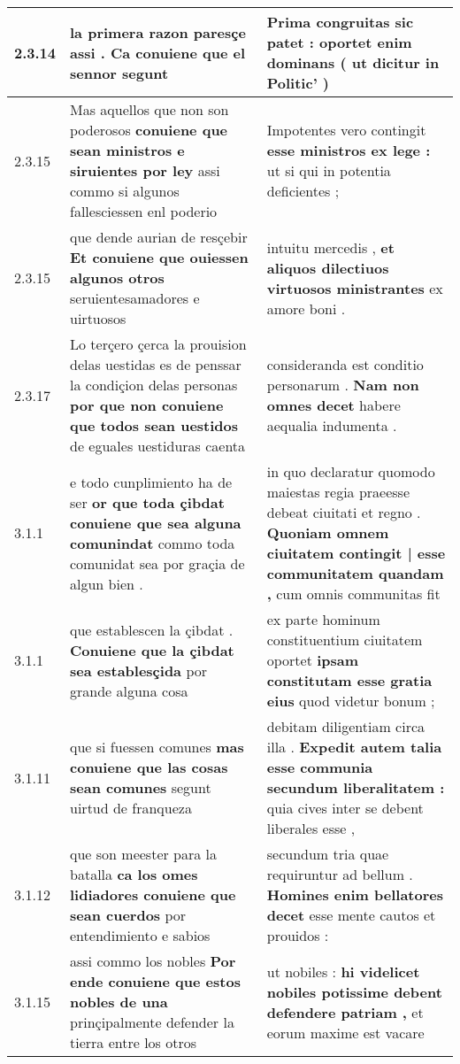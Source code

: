 \begin{tabular}{|p{1cm}|p{6.5cm}|p{6.5cm}|}
2.3.14 & la primera razon paresçe assi . \textbf{ Ca conuiene que el sennor } segunt & Prima congruitas sic patet : \textbf{ oportet enim dominans } ( ut dicitur in Politic’ ) \\\hline
2.3.15 & Mas aquellos que non son poderosos \textbf{ conuiene que sean ministros e siruientes por ley } assi commo si algunos fallesciessen enl poderio & Impotentes vero contingit \textbf{ esse ministros ex lege : } ut si qui in potentia deficientes ; \\\hline
2.3.15 & que dende aurian de resçebir \textbf{ Et conuiene que ouiessen algunos otros } seruientesamadores e uirtuosos & intuitu mercedis , \textbf{ et aliquos dilectiuos virtuosos ministrantes } ex amore boni . \\\hline
2.3.17 & Lo terçero çerca la prouision delas uestidas es de penssar la condiçion delas personas \textbf{ por que non conuiene que todos sean uestidos } de eguales uestiduras caenta & consideranda est conditio personarum . \textbf{ Nam non omnes decet } habere aequalia indumenta . \\\hline
3.1.1 & e todo cunplimiento ha de ser \textbf{ or que toda çibdat conuiene que sea alguna comunindat } commo toda comunidat sea por graçia de algun bien . & in quo declaratur quomodo maiestas regia praeesse debeat ciuitati et regno . \textbf{ Quoniam omnem ciuitatem contingit | esse communitatem quandam , } cum omnis communitas fit \\\hline
3.1.1 & que establescen la çibdat . \textbf{ Conuiene que la çibdat sea establesçida } por grande alguna cosa & ex parte hominum constituentium ciuitatem oportet \textbf{ ipsam constitutam esse gratia eius } quod videtur bonum ; \\\hline
3.1.11 & que si fuessen comunes \textbf{ mas conuiene que las cosas sean comunes } segunt uirtud de franqueza & debitam diligentiam circa illa . \textbf{ Expedit autem talia esse communia secundum liberalitatem : } quia cives inter se debent liberales esse , \\\hline
3.1.12 & que son meester para la batalla \textbf{ ca los omes lidiadores conuiene que sean cuerdos } por entendimiento e sabios & secundum tria quae requiruntur ad bellum . \textbf{ Homines enim bellatores decet } esse mente cautos et prouidos : \\\hline
3.1.15 & assi commo los nobles \textbf{ Por ende conuiene que estos nobles de una } prinçipalmente defender la tierra entre los otros & ut nobiles : \textbf{ hi videlicet nobiles potissime debent defendere patriam , } et eorum maxime est vacare \\\hline

\end{tabular}
